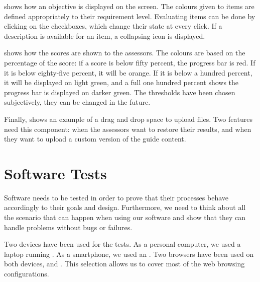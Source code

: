 
 shows how an objective is displayed on the screen. The colours given to items are defined appropriately to their requirement level. Evaluating items can be done by clicking on the checkboxes, which change their state at every click. If a description is available for an item, a collapsing icon is displayed.


 shows how the scores are shown to the assessors. The colours are based on the percentage of the score: if a score is below fifty percent, the progress bar is red. If it is below eighty-five percent, it will be orange. If it is below a hundred percent, it will be displayed on light green, and a full one hundred percent shows the progress bar is displayed on darker green. The thresholds have been chosen subjectively, they can be changed in the future.


Finally,  shows an example of a drag and drop space to upload files. Two features need this component: when the assessors want to restore their results, and when they want to upload a custom version of the guide content.


\section{Software Tests}
\label{sec:app_tests}

Software needs to be tested in order to prove that their processes behave accordingly to their goals and design. Furthermore, we need to think about all the scenario that can happen when using our software and show that they can handle problems without bugs or failures.

Two devices have been used for the tests. As a personal computer, we used a laptop running . As a smartphone, we used an  . Two browsers have been used on both devices,  and . This selection allows us to cover most of the web browsing configurations.

